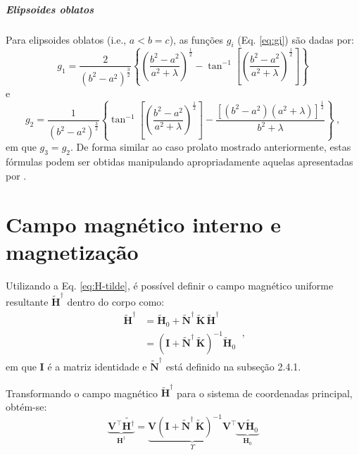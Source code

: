 \subparagraph*{Elipsoides oblatos}


Para elipsoides oblatos (i.e., $a < b = c$), as funções
$g_{i}$ (Eq. \ref{eq:gi}) são dadas por:
\begin{equation}
g_{1} =  \frac{2}{\left( b^{2} - a^{2} \right)^{\frac{3}{2}}}
\left\lbrace
\left( \frac{b^{2} - a^{2}}{a^{2} + \lambda}\right)^{\frac{1}{2}} -
\tan^{-1} \left[ \left( \frac{b^{2} - a^{2}}{a^{2} + \lambda}\right)^{\frac{1}{2}} \right]
\right\rbrace
\label{eq:g1-oblate}
\end{equation}
e
\begin{equation}
g_{2} =  \frac{1}{\left( b^{2} - a^{2} \right)^{\frac{3}{2}}}
\left\lbrace
\tan^{-1} \left[ \left( \frac{b^{2} - a^{2}}{a^{2} + \lambda}\right)^{\frac{1}{2}} \right] -
\frac{\left[ \left( b^{2} - a^{2} \right)
	\left( a^{2} + \lambda \right) \right]^{\frac{1}{2}}}
{b^{2} + \lambda}
\right\rbrace \: ,
\label{eq:g2-oblate}
\end{equation}
em que $g_{3} = g_{2}$.
De forma similar ao caso prolato mostrado anteriormente,
estas fórmulas podem ser obtidas manipulando apropriadamente aquelas
apresentadas por \citep{emerson1985}.

\section{Campo magnético interno e magnetização}

Utilizando a Eq. \ref{eq:H-tilde}, é possível definir o campo magnético uniforme resultante $\tilde{\mathbf{H}}^{\dagger}$ dentro do corpo como:
\begin{equation}
\begin{split}
\tilde{\mathbf{H}}^{\dagger}
&= \tilde{\mathbf{H}}_{0} + \tilde{\mathbf{N}}^{\dagger} \, \tilde{\mathbf{K}} \, \tilde{\mathbf{H}}^{\dagger} \\
&= 
\left( \mathbf{I} + \tilde{\mathbf{N}}^{\dagger} \, \tilde{\mathbf{K}} \right)^{-1}
\tilde{\mathbf{H}}_{0}
\end{split} \: ,
\label{eq:Hi-tilde}
\end{equation}
em que $\mathbf{I}$ é a matriz identidade e
$\tilde{\mathbf{N}}^{\dagger}$ está definido na subseção 2.4.1.

Transformando o campo magnético $\tilde{\mathbf{H}}^{\dagger}$ para o sistema de coordenadas principal, obtém-se:
\begin{equation}
\underbrace{\mathbf{V}^{\top} \tilde{\mathbf{H}^{\dagger}}}_{\mathbf{H}^{\dagger}} =  
\underbrace{\mathbf{V} \left ( \mathbf{I} + \tilde{\mathbf{N}}^{\dagger} \, \tilde{\mathbf{K}} \right)^{-1} \mathbf{V}^{\top}}_{\Upsilon}
\underbrace{\mathbf{V} \tilde{\mathbf{H}}_{0}}_{\mathbf{H}_{0}}
\label{eq:Hi}
\end{equation}

